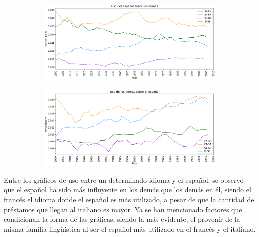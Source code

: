 \begin{figure}[h!]
	
	\begin{subfigure}{}
		\centering
		\includegraphics[scale=.38]{Cap_3/PF1_S2_SP.png}
		\caption{}
		\label{fig:ST_SP_a}
	\end{subfigure}
	
	\begin{subfigure}{}
		\centering
		\includegraphics[scale=.38]{Cap_3/PF2_S2_SP.png}
		\caption{}
		\label{fig:ST_SP_b}
	\end{subfigure}
	
\end{figure}


Entre los gráficos de uso entre un determinado idioma y el español, se observó que el español ha sido más influyente en los demás que los demás en él,  siendo el francés el idioma donde el español es más utilizado, a pesar de que la cantidad de préstamos que llegan al italiano es mayor.   Ya se han mencionado factores que condicionan la forma de las gráficas, siendo la más evidente, el provenir de la misma familia lingüística al ser el español más utilizado en el francés y el italiano. 

